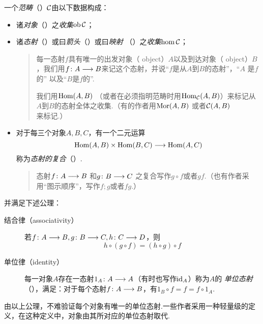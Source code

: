   \begin{defn}
  一个\emph{范畴}（）${\cal C}$由以下数据构成：
  \begin{itemize}
    \item 诸\emph{对象}（）之\emph{收集}$\operatorname{ob}{\cal C}$；
    \item 诸\emph{态射}（）或曰\emph{箭头}（）或曰\emph{映射} （）之\emph{收集}$\hom{\cal C}$；

          \begin{quote}
             每一态射$f$具有唯一的出发对象（ object）$A$以及到达对象（ object）$B$，我们用$f\colon A\longrightarrow B$来记这个态射，并说“$f$是从$A$到$B$的态射”，“$A$ 是$f$的” 以及“$B$是$f$的”.

             我们用$\operatorname{Hom}(A, B)$ （或者在必须指明范畴时用$\operatorname{Hom}_{{\cal C}}(A, B)$）来标记从$A$到$B$的态射全体之收集.（有的作者用$\operatorname{Mor}(A, B)$ 或者${\cal C}(A,B)$来标记.）
          \end{quote}
    \item 对于每三个对象$A,B,C$，有一个二元运算
             \begin{equation*}
               \operatorname{Hom}(A, B) \times \operatorname{Hom}(B, C) \longrightarrow \operatorname{Hom}(A, C)
             \end{equation*}
             称为\emph{态射的复合}（）.

             \begin{quote}
             态射$f\colon A \longrightarrow B$ 和$g\colon B \longrightarrow C$ 之复合写作$g\circ f$或者$gf$.（也有作者采用“图示顺序”，写作$f;g$或者$fg$.）
             \end{quote}
  \end{itemize}
  并满足下述公理：
  \begin{description}
    \item[结合律（associativity）] 若$f\colon A \longrightarrow B, g\colon B \longrightarrow C, h\colon C \longrightarrow D$，则
                                 \begin{equation*}
                                   h\circ(g\circ f) = (h\circ g)\circ f
                                 \end{equation*}
    \item[单位律（identity）] 每一对象$A$存在一态射$1_A\colon A \longrightarrow A$（有时也写作$\operatorname{id}_A$）称为$A$的
                                                  \emph{单位态射}（），满足：对于每个态射$f\colon A \longrightarrow B$，有$1_B \circ f = f = f \circ 1_A$.
  \end{description}
  由以上公理，不难验证每个对象有唯一的单位态射.一些作者采用一种轻量级的定义，在这种定义中，对象由其所对应的单位态射取代.
  \end{defn}
